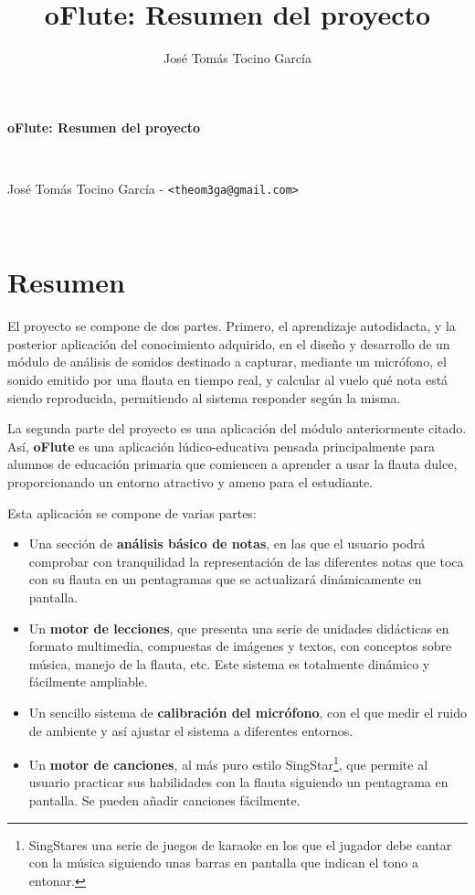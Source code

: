 \documentclass{article}
\title{oFlute: Resumen del proyecto}
\author{José Tomás Tocino García}
\date{}
\begin{document}
\pagestyle{empty}
\begin{center}
\begin{Large}\textbf{oFlute: Resumen del proyecto}\end{Large}\\
\begin{large}José Tomás Tocino García - \texttt{<theom3ga@gmail.com>}\end{large}\\[0.1cm]

 
\end{center}

\part*{Resumen}

El proyecto se compone de dos partes. Primero, el aprendizaje
autodidacta, y la posterior aplicación del conocimiento adquirido, en
el diseño y desarrollo de un módulo de análisis de sonidos destinado a
capturar, mediante un micrófono, el sonido emitido por una flauta en
tiempo real, y calcular al vuelo qué nota está siendo reproducida,
permitiendo al sistema responder según la misma.

La segunda parte del proyecto es una aplicación del módulo
anteriormente citado. Así, \textbf{oFlute} es una aplicación
lúdico-educativa pensada principalmente para alumnos de educación
primaria que comiencen a aprender a usar la flauta dulce,
proporcionando un entorno atractivo y ameno para el estudiante.

Esta aplicación se compone de varias partes:
\begin{itemize}
\item Una sección de \textbf{análisis básico de notas}, en las que el usuario
  podrá comprobar con tranquilidad la representación de las diferentes
  notas que toca con su flauta en un pentagramas que se actualizará
  dinámicamente en pantalla.
\item Un \textbf{motor de lecciones}, que presenta una serie de unidades
  didácticas en formato multimedia, compuestas de imágenes y textos,
  con conceptos sobre música, manejo de la flauta, etc. Este sistema
  es totalmente dinámico y fácilmente ampliable.
\item Un sencillo sistema de \textbf{calibración del micrófono}, con el que
  medir el ruido de ambiente y así ajustar el sistema a diferentes
  entornos.
\item Un \textbf{motor de canciones}, al más puro estilo
  SingStar\textregistered \footnote{SingStar\textregistered es una
    serie de juegos de karaoke en los que el jugador debe cantar con
    la música siguiendo unas barras en pantalla que indican el tono a
    entonar.}, que permite al usuario practicar sus habilidades con la
  flauta siguiendo un pentagrama en pantalla. Se pueden añadir
  canciones fácilmente.
\end{itemize}
\end{document}
